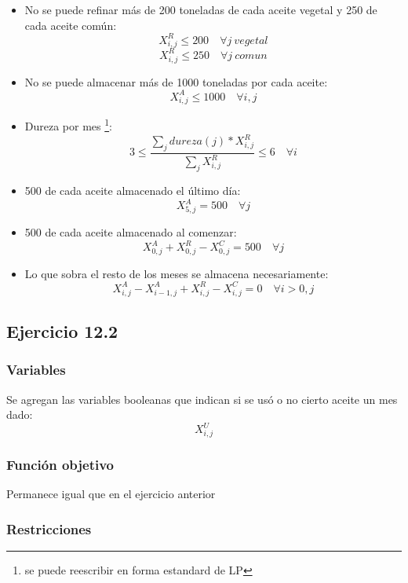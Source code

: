 \begin{itemize}
    \item No se puede refinar más de 200 toneladas de cada aceite vegetal y 250 de cada aceite común:
    $$ X^R_{i,j} \leq 200 \quad \forall j \ vegetal $$
    $$ X^R_{i,j} \leq 250 \quad \forall j \ comun $$
    \item No se puede almacenar más de 1000 toneladas por cada aceite:
    $$ X^A_{i,j} \leq 1000 \quad \forall i,j $$
    \item Dureza por mes \footnote{se puede reescribir en forma estandard de LP}:
    $$ 3 \leq \frac{\sum_{j} dureza(j)*X^R_{i,j}}{\sum_{j} X^R_{i,j}} \leq 6 \quad \forall i$$
    \item 500 de cada aceite almacenado el último día:
    $$ X^A_{5,j} = 500 \quad \forall j$$
    \item 500 de cada aceite almacenado al comenzar:
    $$ X^A_{0,j} + X^R_{0,j} - X^C_{0,j} = 500  \quad \forall j $$
    \item Lo que sobra el resto de los meses se almacena necesariamente:
    $$  X^A_{i,j} - X^A_{i-1,j} + X^R_{i,j} - X^C_{i,j} = 0 \quad \forall i>0,j  $$
\end{itemize}

\subsection{Ejercicio 12.2}

\subsubsection{Variables}
Se agregan las variables booleanas que indican si se usó o no cierto aceite un mes dado:
$$X^U_{i,j}$$

\subsubsection{Función objetivo}
Permanece igual que en el ejercicio anterior

\subsubsection{Restricciones}

